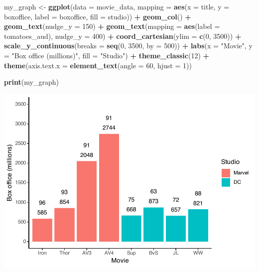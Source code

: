\documentclass[
]{krantz}
\makeatletter
\newenvironment{Shaded}{\begin{snugshade}}{\end{snugshade}}
\newcommand{\DataTypeTok}[1]{\textcolor[rgb]{0.27,0.27,0.27}{#1}}
\newcommand{\DecValTok}[1]{\textcolor[rgb]{0.06,0.06,0.06}{#1}}
\newcommand{\KeywordTok}[1]{\textcolor[rgb]{0.27,0.27,0.27}{\textbf{#1}}}
\newcommand{\NormalTok}[1]{#1}
\newcommand{\OperatorTok}[1]{\textcolor[rgb]{0.43,0.43,0.43}{\textbf{#1}}}
\newcommand{\StringTok}[1]{\textcolor[rgb]{0.5,0.5,0.5}{#1}}
\newenvironment{kframe}{%
\medskip{}
\setlength{\fboxsep}{.8em}
 \def\at@end@of@kframe{}%
 \ifinner\ifhmode%
  \def\at@end@of@kframe{\end{minipage}}%
  \begin{minipage}{\columnwidth}%
 \fi\fi%
 \def\FrameCommand##1{\hskip\@totalleftmargin \hskip-\fboxsep
 \colorbox{shadecolor}{##1}\hskip-\fboxsep
     \hskip-\linewidth \hskip-\@totalleftmargin \hskip\columnwidth}%
 \MakeFramed {\advance\hsize-\width
   \@totalleftmargin\z@ \linewidth\hsize
   \@setminipage}}%
 {\par\unskip\endMakeFramed%
 \at@end@of@kframe}
\renewenvironment{Shaded}{\begin{kframe}}{\end{kframe}}
\makeatother
\begin{document}
\begin{Shaded}
\begin{Highlighting}[]
\NormalTok{my_graph <-}\StringTok{ }\KeywordTok{ggplot}\NormalTok{(}\DataTypeTok{data =}\NormalTok{ movie_data,}
           \DataTypeTok{mapping =} \KeywordTok{aes}\NormalTok{(}\DataTypeTok{x =}\NormalTok{ title,}
                         \DataTypeTok{y =}\NormalTok{ boxoffice,}
                         \DataTypeTok{label =}\NormalTok{ boxoffice, }
                         \DataTypeTok{fill =}\NormalTok{ studio)) }\OperatorTok{+}
\StringTok{  }\KeywordTok{geom_col}\NormalTok{() }\OperatorTok{+}
\StringTok{  }\KeywordTok{geom_text}\NormalTok{(}\DataTypeTok{nudge_y =} \DecValTok{150}\NormalTok{)  }\OperatorTok{+}
\StringTok{  }\KeywordTok{geom_text}\NormalTok{(}\DataTypeTok{mapping =} \KeywordTok{aes}\NormalTok{(}\DataTypeTok{label =}\NormalTok{ tomatoes_aud), }
            \DataTypeTok{nudge_y =} \DecValTok{400}\NormalTok{) }\OperatorTok{+}
\StringTok{  }\KeywordTok{coord_cartesian}\NormalTok{(}\DataTypeTok{ylim =} \KeywordTok{c}\NormalTok{(}\DecValTok{0}\NormalTok{, }\DecValTok{3500}\NormalTok{)) }\OperatorTok{+}
\StringTok{  }\KeywordTok{scale_y_continuous}\NormalTok{(}\DataTypeTok{breaks =} \KeywordTok{seq}\NormalTok{(}\DecValTok{0}\NormalTok{, }\DecValTok{3500}\NormalTok{, }\DataTypeTok{by =} \DecValTok{500}\NormalTok{)) }\OperatorTok{+}
\StringTok{  }\KeywordTok{labs}\NormalTok{(}\DataTypeTok{x =} \StringTok{"Movie"}\NormalTok{,}
       \DataTypeTok{y =} \StringTok{"Box office (millions)"}\NormalTok{,}
       \DataTypeTok{fill =} \StringTok{"Studio"}\NormalTok{) }\OperatorTok{+}
\StringTok{  }\KeywordTok{theme_classic}\NormalTok{(}\DecValTok{12}\NormalTok{) }\OperatorTok{+}
\StringTok{  }\KeywordTok{theme}\NormalTok{(}\DataTypeTok{axis.text.x =} \KeywordTok{element_text}\NormalTok{(}\DataTypeTok{angle =} \DecValTok{60}\NormalTok{, }
                                   \DataTypeTok{hjust =} \DecValTok{1}\NormalTok{))  }

\KeywordTok{print}\NormalTok{(my_graph)}
\end{Highlighting}
\end{Shaded}

\includegraphics[width=0.65\linewidth]{bookdown_files/figure-latex/unnamed-chunk-127-1}
\end{document}
